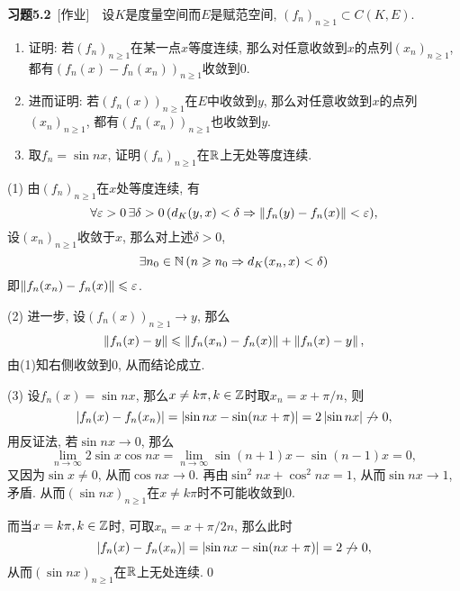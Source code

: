     \textbf{习题5.2}\ [作业]\ \ 设$ K $是度量空间而$ E $是赋范空间, $ (f_n)_{n\geqslant 1}\subset C(K,E) $.
    \begin{enumerate}[(1)]
    \item 证明: 若$ (f_n)_{n\geqslant 1} $在某一点$ x $等度连续, 那么对任意收敛到$ x $的点列$ (x_n)_{n\geqslant 1} $, 都有$ (f_n(x)-f_n(x_n))_{n\geqslant 1} $收敛到0.
    \item 进而证明: 若$ (f_n(x))_{n\geqslant 1} $在$ E $中收敛到$ y $, 那么对任意收敛到$ x $的点列$ (x_n)_{n\geqslant 1} $, 都有$ (f_n(x_n))_{n\geqslant 1} $也收敛到$ y $.
    \item 取$ f_n=\sin nx $, 证明$ (f_n)_{n\geqslant 1} $在$ \mathbb{R} $上无处等度连续.
    \end{enumerate}
    \begin{Proof}
    (1) 由$ (f_n)_{n\geqslant 1} $在$ x $处等度连续, 有
    \[
    \forall\varepsilon>0\,\exists\delta>0\,(d_K(y,x)<\delta\Rightarrow \left\| f_n(y)-f_n(x) \right\|<\varepsilon),
    \]
    设$ (x_n)_{n\geqslant 1} $收敛于$ x $, 那么对上述$ \delta>0 $,
    \[
    \exists n_0\in\mathbb{N}\,(n\geqslant n_0\Rightarrow d_K(x_n,x)<\delta)
    \]
    即$ \left\| f_n(x_n)-f_n(x) \right\|\leqslant\varepsilon $.
    
    (2) 进一步, 设$ (f_n(x))_{n\geqslant 1}\to y $, 那么
    \[
    \left\| f_n(x)-y \right\|\leqslant\left\| f_n(x_n)-f_n(x) \right\|+\left\| f_n(x)-y \right\|,
    \]
    由(1)知右侧收敛到0, 从而结论成立.
    
    (3) 设$ f_n(x)=\sin nx $, 那么$ x\ne k\pi, k\in\mathbb{Z} $时取$ x_n=x+\pi/n $, 则
    \[
    \left| f_n(x)-f_n(x_n) \right| =\left| \sin nx-\sin(nx+\pi) \right| =2\left| \sin nx \right| \not\to 0,
    \]
    用反证法, 若$ \sin nx\to 0 $, 那么
    \[
    \lim_{n\to\infty}2\sin x\cos nx=\lim_{n\to\infty}\sin(n+1)x-\sin(n-1)x=0,
    \]
    又因为$ \sin x\ne 0 $, 从而$ \cos nx\to 0 $. 再由$ \sin^2 nx+\cos^2 nx=1 $, 从而$ \sin nx\to 1 $, 矛盾. 从而$ (\sin nx)_{n\geqslant 1} $在$ x\ne k\pi $时不可能收敛到0.
    
    而当$ x=k\pi, k\in\mathbb{Z} $时, 可取$ x_n=x+\pi/2n $, 那么此时
    \[
    \left| f_n(x)-f_n(x_n) \right| =\left| \sin nx-\sin(nx+\pi) \right| =2\not\to 0,
    \]
    从而$ (\sin nx)_{n\geqslant 1} $在$ \mathbb{R} $上无处连续.\qed
    \end{Proof}
